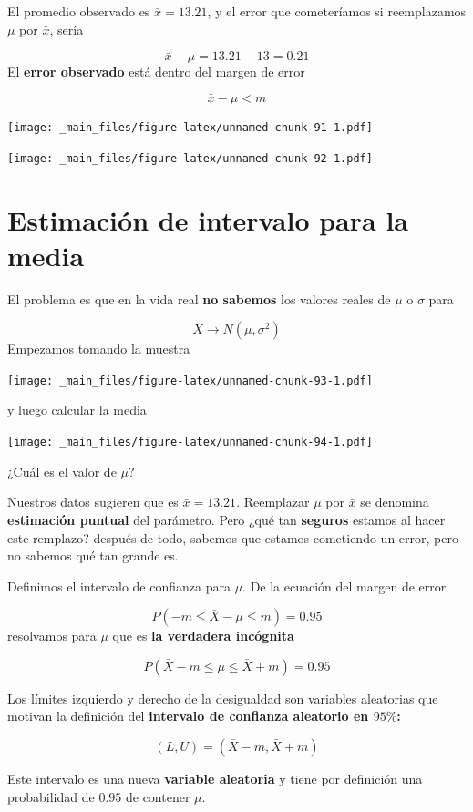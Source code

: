 \documentclass[
]{book}
\begin{document}
El promedio observado es \(\bar{x}=13.21\), y el error que cometeríamos si reemplazamos \(\mu\) por \(\bar{x}\), sería

\[\bar{x}-\mu=13.21-13=0.21\]
El \textbf{error observado} está dentro del margen de error

\[\bar{x}-\mu <m\]

\texttt{[image: \_main\_files/figure-latex/unnamed-chunk-91-1.pdf]}

\texttt{[image: \_main\_files/figure-latex/unnamed-chunk-92-1.pdf]}

\hypertarget{estimaciuxf3n-de-intervalo-para-la-media}{%
\section{Estimación de intervalo para la media}\label{estimaciuxf3n-de-intervalo-para-la-media}}

El problema es que en la vida real \textbf{no sabemos} los valores reales de \(\mu\) o \(\sigma\) para

\[X \rightarrow N(\mu, \sigma^2)\]
Empezamos tomando la muestra

\texttt{[image: \_main\_files/figure-latex/unnamed-chunk-93-1.pdf]}

y luego calcular la media

\texttt{[image: \_main\_files/figure-latex/unnamed-chunk-94-1.pdf]}

¿Cuál es el valor de \(\mu\)?

Nuestros datos sugieren que es \(\bar{x}=13.21\). Reemplazar \(\mu\) por \(\bar{x}\) se denomina \textbf{estimación puntual} del parámetro. Pero ¿qué tan \textbf{seguros} estamos al hacer este remplazo? después de todo, sabemos que estamos cometiendo un error, pero no sabemos qué tan grande es.

Definimos el intervalo de confianza para \(\mu\). De la ecuación del margen de error

\[P(-m \leq \bar{X} - \mu \leq m)=0.95\]
resolvamos para \(\mu\) que es \textbf{la verdadera incógnita}

\[P(\bar{X} - m \leq \mu \leq \bar{X} + m)=0.95\]

Los límites izquierdo y derecho de la desigualdad son variables aleatorias que motivan la definición del \textbf{intervalo de confianza aleatorio en \(95\%\):}

\[(L,U)=(\bar{X} - m,\bar{X} + m)\]

Este intervalo es una nueva \textbf{variable aleatoria} y tiene por definición una probabilidad de \(0.95\) de contener \(\mu\).
\end{document}
